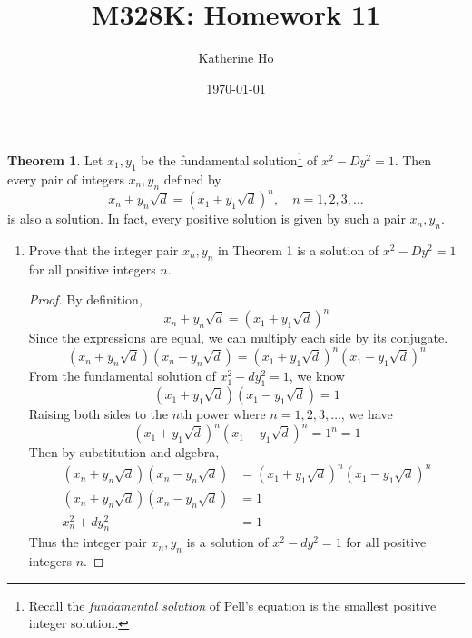 \documentclass[11pt]{article}
\title{M328K: Homework 11}
\author{Katherine Ho}
\date\today
\theoremstyle{definition}
\newtheorem{thm}{Theorem}
\begin{document}
\maketitle

\begin{thm}
    Let $x_1,y_1$ be the fundamental solution\footnote{Recall the \emph{fundamental solution} of Pell's equation is the smallest positive integer solution.} of $x^2-D y^2 = 1$. Then every pair of integers $x_n, y_n$ defined by
        $$ x_n + y_n \sqrt{d} = (x_1 + y_1 \sqrt{d})^n, \quad n=1,2,3,\dots$$ is also a solution. In fact, every positive solution is given by such a pair $x_n, y_n$.
\end{thm}

\begin{enumerate}
    \item Prove that the integer pair $x_n, y_n$ in Theorem 1 is a solution of $x^2-D y^2 = 1$ for all positive integers $n$. 
    \begin{proof}
        By definition, 
        \[
            x_n + y_n\sqrt{d} = (x_1 + y_1\sqrt{d})^n
        \]
        Since the expressions are equal, we can multiply each side by its conjugate.
        \[
            (x_n + y_n\sqrt{d})(x_n - y_n\sqrt{d}) = (x_1 + y_1\sqrt{d})^n (x_1 - y_1\sqrt{d})^n 
        \]
        From the fundamental solution of $x_1^2-dy_1^2 = 1$, we know 
        \[
            (x_1 + y_1\sqrt{d}) (x_1 - y_1\sqrt{d}) = 1
        \]
        Raising both sides to the $n$th power where $n = 1, 2, 3, \dots$, we have
        \[
            (x_1 + y_1\sqrt{d})^n (x_1 - y_1\sqrt{d})^n = 1^n = 1
        \]
        Then by substitution and algebra, 
        \begin{align*}
            (x_n + y_n\sqrt{d})(x_n - y_n\sqrt{d}) &= (x_1 + y_1\sqrt{d})^n (x_1 - y_1\sqrt{d})^n \\
            (x_n + y_n\sqrt{d})(x_n - y_n\sqrt{d}) &= 1 \\
            x_n^2 + dy_n^2 &= 1
        \end{align*}
        Thus the integer pair $x_n, y_n$ is a solution of $x^2 - dy^2 = 1$ for all positive integers $n$. 
    \end{proof}
    

\end{enumerate}
\end{document}
